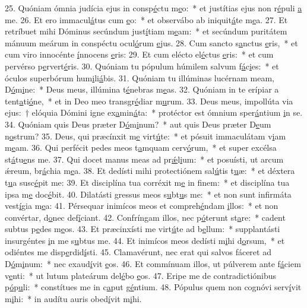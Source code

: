 25. Quóniam ómnia judícia ejus in consp\uline{é}ctu m\uline{e}o:~* et justítias ejus non r\uline{é}puli \uline{a} me.
26. Et ero immacul\uline{á}tus cum \uline{e}o:~* et observábo ab iniquit\uline{á}te m\uline{e}a.
27. Et retríbuet mihi Dóminus secúndum just\uline{í}tiam m\uline{e}am:~* et secúndum puritátem mánuum meárum in conspéctu ocul\uline{ó}rum \uline{e}jus.
28. Cum sancto s\uline{a}nctus \uline{e}ris,~* et cum viro innocénte \uline{í}nnocens \uline{e}ris:
29. Et cum elécto el\uline{é}ctus \uline{e}ris:~* et cum pervérso p\uline{e}rvert\uline{é}ris.
30. Quóniam tu pópulum húmilem salvum f\uline{á}c\uline{i}es:~* et óculos superbórum hum\uline{i}li\uline{á}bis.
31. Quóniam tu illúminas lucérnam meam, D\uline{ó}m\uline{i}ne:~* Deus meus, illúmina t\uline{é}nebras m\uline{e}as.
32. Quóniam in te erípiar a tent\uline{a}ti\uline{ó}ne,~* et in Deo meo transgr\uline{é}diar m\uline{u}rum.
33. Deus meus, impollúta via ejus:~† elóquia Dómini igne ex\uline{a}min\uline{á}ta:~* protéctor est ómnium sper\uline{á}ntium \uline{i}n se.
34. Quóniam quis Deus præter D\uline{ó}m\uline{i}num?~* aut quis Deus præter D\uline{e}um n\uline{o}strum?
35. Deus, qui præcínxit m\uline{e} virt\uline{ú}te:~* et pósuit immaculátam v\uline{i}am m\uline{e}am.
36. Qui perfécit pedes meos t\uline{a}mquam cerv\uline{ó}rum,~* et super excélsa st\uline{á}tu\uline{e}ns me.
37. Qui docet manus meas ad pr\uline{ǽ}l\uline{i}um:~* et posuísti, ut arcum ǽreum, br\uline{á}chia m\uline{e}a.
38. Et dedísti mihi protectiónem sal\uline{ú}tis t\uline{u}æ:~* et déxtera t\uline{u}a susc\uline{é}pit me:
39. Et disciplína tua corréxit m\uline{e} in f\uline{i}nem:~* et disciplína tua ipsa m\uline{e} doc\uline{é}bit.
40. Dilatásti gressus meos s\uline{u}bt\uline{u}s me:~* et non sunt infirmáta vest\uline{í}gia m\uline{e}a:
41. Pérsequar inimícos meos et compreh\uline{é}ndam \uline{i}llos:~* et non convértar, d\uline{o}nec def\uline{í}ciant.
42. Confríngam illos, nec p\uline{ó}terunt st\uline{a}re:~* cadent subtus p\uline{e}des m\uline{e}os.
43. Et præcinxísti me virt\uline{ú}te ad b\uline{e}llum:~* supplantásti insurgéntes \uline{i}n me s\uline{u}btus me.
44. Et inimícos meos dedísti m\uline{i}hi d\uline{o}rsum,~* et odiéntes me disp\uline{e}rdid\uline{í}sti.
45. Clamavérunt, nec erat qui salvos fáceret ad D\uline{ó}m\uline{i}num:~* nec exaud\uline{í}vit \uline{e}os.
46. Et commínuam illos, ut púlverem ante f\uline{á}ciem v\uline{e}nti:~* ut lutum plateárum del\uline{é}bo \uline{e}os.
47. Eripe me de contradictiónibus p\uline{ó}p\uline{u}li:~* constítues me in c\uline{a}put g\uline{é}ntium.
48. Pópulus quem non cognóvi serv\uline{í}vit m\uline{i}hi:~* in audítu auris obed\uline{í}vit m\uline{i}hi.
